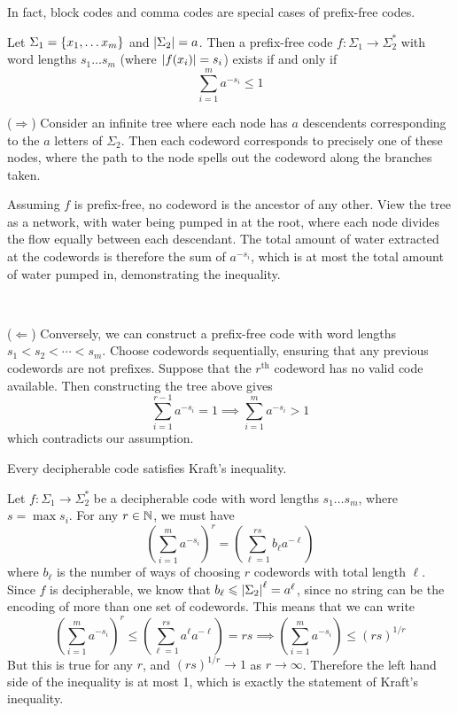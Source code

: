 \documentclass{article}
\begin{document}
\begin{note}
	In fact, block codes and comma codes are special cases of prefix-free codes.
\end{note}

\begin{theorem}
	\label{krafts-inequality}
    Let $\Sigma_1 = \left\lbrace x_1, \dots x_m \right\rbrace$ and $\left\lvert \Sigma_2 \right\rvert = a$. Then a prefix-free code $f: \Sigma_1 \to \Sigma_2^*$ with word lengths $s_1 \dots s_m$ (where $\left\lvert f(x_i) \right\rvert = s_i$) exists if and only if
    \[
	\sum_{i=1}^m a^{-s_i} \leq 1
	\]
\end{theorem}

\begin{prf}
    ($\Rightarrow$) Consider an infinite tree where each node has $a$ descendents corresponding to the $a$ letters of $\Sigma_2$. Then each codeword corresponds to precisely one of these nodes, where the path to the node spells out the codeword along the branches taken.
    
    Assuming $f$ is prefix-free, no codeword is the ancestor of any other. View the tree as a network, with water being pumped in at the root, where each node divides the flow equally between each descendant. The total amount of water extracted at the codewords is therefore the sum of $a^{-s_i}$, which is at most the total amount of water pumped in, demonstrating the inequality. 
    
    \ 
    
    ($\Leftarrow$) Conversely, we can construct a prefix-free code with word lengths $s_1 < s_2 < \cdots < s_m$. Choose codewords sequentially, ensuring that any previous codewords are not prefixes. Suppose that the $r^\text{th}$ codeword has no valid code available. Then constructing the tree above gives
    \[
	\sum_{i=1}^{r-1} a^{-s_i} = 1 \implies \sum_{i=1}^{m} a^{-s_i} > 1
	\]
	which contradicts our assumption.
\end{prf}

\begin{theorem}
	\label{mcmillan-karush}
    Every decipherable code satisfies Kraft's inequality.
\end{theorem}
\begin{prf}
	Let $f: \Sigma_1 \to \Sigma_2^*$ be a decipherable code with word lengths $s_1 \dots s_m$, where $s = \max s_i$. For any $r \in \mathbb{N}$, we must have
	\[
	\left( \sum_{i=1}^m a^{-s_i} \right)^r = \left( \sum_{\ell=1}^{rs} b_\ell a^{-\ell} \right)
	\]
	where $b_\ell$ is the number of ways of choosing $r$ codewords with total length $\ell$. Since $f$ is decipherable, we know that $b_\ell \leqslant \left\lvert \Sigma_2 \right\rvert^\ell = a^\ell$, since no string can be the encoding of more than one set of codewords. This means that we can write
	\[
	\left( \sum_{i=1}^m a^{-s_i} \right)^r \leq  \left( \sum_{\ell=1}^{rs} a^\ell a^{-\ell} \right) = rs \implies \left( \sum_{i=1}^m a^{-s_i} \right) \leq (rs)^{1/r}
	\]
	But this is true for any $r$, and $(rs)^{1/r} \to 1$ as $r \to \infty$. Therefore the left hand side of the inequality is at most 1, which is exactly the statement of Kraft's inequality.
\end{prf}
\end{document}
